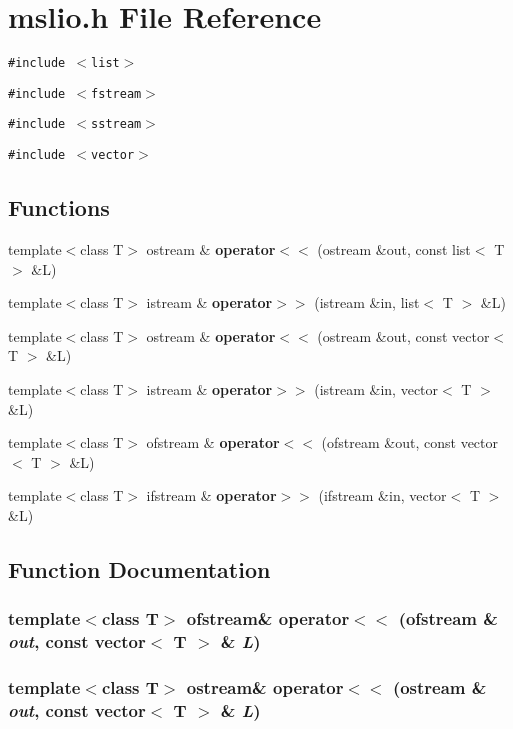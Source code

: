 \section{mslio.h File Reference}
\label{mslio_8h}
{\tt \#include $<$list$>$}\par
{\tt \#include $<$fstream$>$}\par
{\tt \#include $<$sstream$>$}\par
{\tt \#include $<$vector$>$}\par
\subsection*{Functions}
\begin{CompactItemize}
\item 
template$<$class T$>$ ostream \& {\bf operator$<$$<$} (ostream \&out, const list$<$ T $>$ \&L)
\item 
template$<$class T$>$ istream \& {\bf operator$>$$>$} (istream \&in, list$<$ T $>$ \&L)
\item 
template$<$class T$>$ ostream \& {\bf operator$<$$<$} (ostream \&out, const vector$<$ T $>$ \&L)
\item 
template$<$class T$>$ istream \& {\bf operator$>$$>$} (istream \&in, vector$<$ T $>$ \&L)
\item 
template$<$class T$>$ ofstream \& {\bf operator$<$$<$} (ofstream \&out, const vector$<$ T $>$ \&L)
\item 
template$<$class T$>$ ifstream \& {\bf operator$>$$>$} (ifstream \&in, vector$<$ T $>$ \&L)
\end{CompactItemize}


\subsection{Function Documentation}
\subsubsection{\setlength{\rightskip}{0pt plus 5cm}template$<$class T$>$ ofstream\& operator$<$$<$ (ofstream \& {\em out}, const vector$<$ T $>$ \& {\em L})}\label{mslio_8h_a4}


\subsubsection{\setlength{\rightskip}{0pt plus 5cm}template$<$class T$>$ ostream\& operator$<$$<$ (ostream \& {\em out}, const vector$<$ T $>$ \& {\em L})}\label{mslio_8h_a2}


